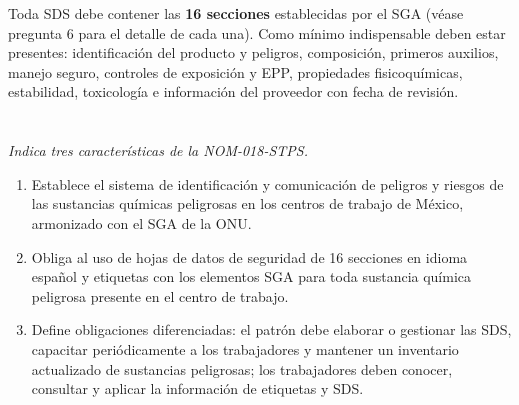 \vspace{0.3cm}
Toda SDS debe contener las \textbf{16 secciones} establecidas por el SGA (véase pregunta 6 para el detalle de cada una). Como mínimo indispensable deben estar presentes: identificación del producto y peligros, composición, primeros auxilios, manejo seguro, controles de exposición y EPP, propiedades fisicoquímicas, estabilidad, toxicología e información del proveedor con fecha de revisión.


{}
\section*{\centering\fontsize{12}{18}}

\textit{Indica tres características de la NOM-018-STPS.}

\vspace{0.3cm}
\begin{enumerate}
    \item Establece el sistema de identificación y comunicación de peligros y riesgos de las sustancias químicas peligrosas en los centros de trabajo de México, armonizado con el SGA de la ONU.
    \item Obliga al uso de hojas de datos de seguridad de 16 secciones en idioma español y etiquetas con los elementos SGA para toda sustancia química peligrosa presente en el centro de trabajo.
    \item Define obligaciones diferenciadas: el patrón debe elaborar o gestionar las SDS, capacitar periódicamente a los trabajadores y mantener un inventario actualizado de sustancias peligrosas; los trabajadores deben conocer, consultar y aplicar la información de etiquetas y SDS.
\end{enumerate}